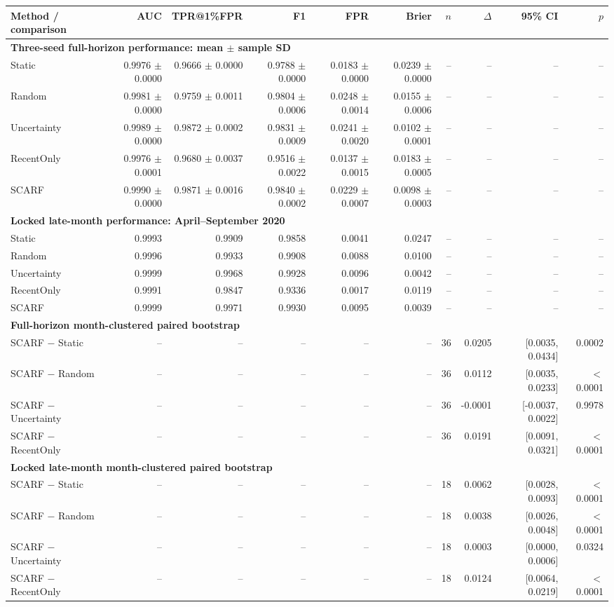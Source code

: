 \setlength{\tabcolsep}{2pt}
\begin{tabular}{lrrrrrrrrr}
\toprule
Method / comparison & AUC & TPR@1\%FPR & F1 & FPR & Brier & $n$ & $\Delta$ & 95\% CI & $p$ \\
\midrule
\multicolumn{10}{l}{\textbf{Three-seed full-horizon performance: mean $\pm$ sample SD}} \\
Static & 0.9976 $\pm$ 0.0000 & 0.9666 $\pm$ 0.0000 & 0.9788 $\pm$ 0.0000 & 0.0183 $\pm$ 0.0000 & 0.0239 $\pm$ 0.0000 & -- & -- & -- & -- \\
Random & 0.9981 $\pm$ 0.0000 & 0.9759 $\pm$ 0.0011 & 0.9804 $\pm$ 0.0006 & 0.0248 $\pm$ 0.0014 & 0.0155 $\pm$ 0.0006 & -- & -- & -- & -- \\
Uncertainty & 0.9989 $\pm$ 0.0000 & 0.9872 $\pm$ 0.0002 & 0.9831 $\pm$ 0.0009 & 0.0241 $\pm$ 0.0020 & 0.0102 $\pm$ 0.0001 & -- & -- & -- & -- \\
RecentOnly & 0.9976 $\pm$ 0.0001 & 0.9680 $\pm$ 0.0037 & 0.9516 $\pm$ 0.0022 & 0.0137 $\pm$ 0.0015 & 0.0183 $\pm$ 0.0005 & -- & -- & -- & -- \\
SCARF & 0.9990 $\pm$ 0.0000 & 0.9871 $\pm$ 0.0016 & 0.9840 $\pm$ 0.0002 & 0.0229 $\pm$ 0.0007 & 0.0098 $\pm$ 0.0003 & -- & -- & -- & -- \\
\midrule
\multicolumn{10}{l}{\textbf{Locked late-month performance: April--September 2020}} \\
Static & 0.9993 & 0.9909 & 0.9858 & 0.0041 & 0.0247 & -- & -- & -- & -- \\
Random & 0.9996 & 0.9933 & 0.9908 & 0.0088 & 0.0100 & -- & -- & -- & -- \\
Uncertainty & 0.9999 & 0.9968 & 0.9928 & 0.0096 & 0.0042 & -- & -- & -- & -- \\
RecentOnly & 0.9991 & 0.9847 & 0.9336 & 0.0017 & 0.0119 & -- & -- & -- & -- \\
SCARF & 0.9999 & 0.9971 & 0.9930 & 0.0095 & 0.0039 & -- & -- & -- & -- \\
\midrule
\multicolumn{10}{l}{\textbf{Full-horizon month-clustered paired bootstrap}} \\
SCARF $-$ Static & -- & -- & -- & -- & -- & 36 & 0.0205 & [0.0035, 0.0434] & 0.0002 \\
SCARF $-$ Random & -- & -- & -- & -- & -- & 36 & 0.0112 & [0.0035, 0.0233] & $<$0.0001 \\
SCARF $-$ Uncertainty & -- & -- & -- & -- & -- & 36 & -0.0001 & [-0.0037, 0.0022] & 0.9978 \\
SCARF $-$ RecentOnly & -- & -- & -- & -- & -- & 36 & 0.0191 & [0.0091, 0.0321] & $<$0.0001 \\
\midrule
\multicolumn{10}{l}{\textbf{Locked late-month month-clustered paired bootstrap}} \\
SCARF $-$ Static & -- & -- & -- & -- & -- & 18 & 0.0062 & [0.0028, 0.0093] & $<$0.0001 \\
SCARF $-$ Random & -- & -- & -- & -- & -- & 18 & 0.0038 & [0.0026, 0.0048] & $<$0.0001 \\
SCARF $-$ Uncertainty & -- & -- & -- & -- & -- & 18 & 0.0003 & [0.0000, 0.0006] & 0.0324 \\
SCARF $-$ RecentOnly & -- & -- & -- & -- & -- & 18 & 0.0124 & [0.0064, 0.0219] & $<$0.0001 \\
\bottomrule
\end{tabular}
